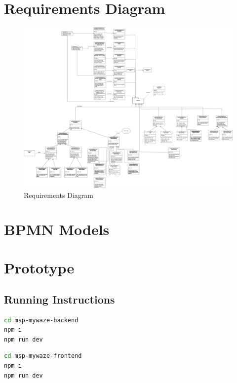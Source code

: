 \documentclass{article}
\begin{document}
\section*{Requirements Diagram}
\begin{figure}[h]
    \centering
    \includegraphics[width=\textwidth]{images/SysML_Req.png}
    \caption{Requirements Diagram}
    \label{fig:requirements_diagram}
\end{figure}

\clearpage

\section*{BPMN Models}


\clearpage

\section*{Prototype}
\subsection*{Running Instructions}

\begin{lstlisting}[language=bash]
cd msp-mywaze-backend
npm i
npm run dev
\end{lstlisting}

\begin{lstlisting}[language=bash]
cd msp-mywaze-frontend
npm i
npm run dev
\end{lstlisting}
\end{document}
